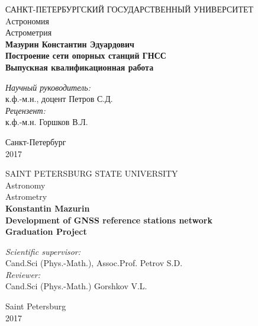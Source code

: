 \documentclass[a4paper,12pt]{report}
\begin{document}
\begin{titlepage}
\begin{center}
{\large САНКТ-ПЕТЕРБУРГСКИЙ ГОСУДАРСТВЕННЫЙ УНИВЕРСИТЕТ \\[6mm] Aстрономия \\ Астрометрия}\\
\vspace{2cm}
{\Large \bf Мазурин Константин Эдуардович } \\
\vspace{2cm}
{\LARGE \bf Построение сети опорных станций ГНСС} \\
\vspace{2cm}
{\large \bf Выпускная квалификационная работа } \\[2cm]
\end{center}

\begin{flushright}
{\it Научный руководитель:} \\
к.ф.-м.н., доцент {\Large Петров С.Д.}\\ [4mm]
{\it Рецензент:} \\
к.ф.-м.н. {\Large Горшков В.Л.} \\ 
\end{flushright}
\vspace{5cm}
\begin{center}
{\large Санкт-Петербург \\[5mm] 2017}
\end{center}
\end{titlepage}

\begin{titlepage}
\begin{center}
{\large SAINT PETERSBURG STATE UNIVERSITY \\[6mm] Astronomy \\ Astrometry}\\
\vspace{2cm}
{\Large \bf Konstantin Mazurin } \\
\vspace{2cm}
{\LARGE \bf Development of GNSS reference stations network } \\
\vspace{2cm}
{\large \bf Graduation Project } \\[2cm]
\end{center}

\begin{flushright}
{\it Scientific supervisor:} \\
Cand.Sci (Phys.-Math.), Assoc.Prof. {\Large Petrov S.D.}\\ [4mm]
{\it Reviewer:} \\
Cand.Sci (Phys.-Math.) {\Large Gorshkov V.L.}\\ 
\end{flushright}
\vspace{5cm}
\begin{center}
{\large Saint Petersburg \\[5mm] 2017}
\end{center}
\end{titlepage}
\end{document}
